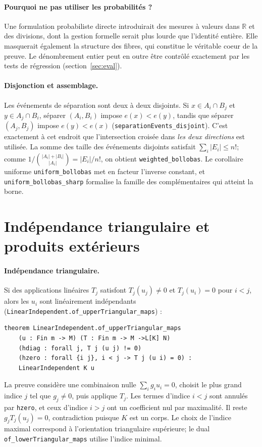 \documentclass[11pt]{article}
\newcommand{\bind}[2]{\binom{#1}{#2}}
\begin{document}
\paragraph{Pourquoi ne pas utiliser les probabilités ?} Une formulation probabiliste
directe introduirait des mesures à valeurs dans $\mathbb{R}$ et des divisions, dont la
gestion formelle serait plus lourde que l'identité entière. Elle masquerait également
la structure des fibres, qui constitue le véritable coeur de la preuve. Le dénombrement
entier peut en outre être contrôlé exactement par les tests de régression
(section~\ref{sec:eval}).

\paragraph{Disjonction et assemblage.} Les événements de séparation sont deux à deux
disjoints. Si $x\in A_i\cap B_j$ et $y\in A_j\cap B_i$, séparer $(A_i,B_i)$ impose
$e(x)<e(y)$, tandis que séparer $(A_j,B_j)$ impose $e(y)<e(x)$
(\lstinline{separationEvents_disjoint}). C'est exactement à cet endroit que
l'intersection croisée dans \emph{les deux directions} est utilisée. La somme des
taille des événements disjoints satisfait $\sum_i|E_i|\le n!$; comme
$1/\bind{|A_i|+|B_i|}{|A_i|}=|E_i|/n!$, on obtient
\lstinline{weighted_bollobas}. Le corollaire uniforme
\lstinline{uniform_bollobas} met en facteur l'inverse constant, et
\lstinline{uniform_bollobas_sharp} formalise la famille des complémentaires qui atteint
la borne.

\section{Indépendance triangulaire et produits extérieurs}\label{sec:ext}

\paragraph{Indépendance triangulaire.} Si des applications linéaires $T_j$ satisfont
$T_j(u_j)\neq0$ et $T_j(u_i)=0$ pour $i<j$, alors les $u_i$ sont linéairement
indépendants (\lstinline{LinearIndependent.of_upperTriangular_maps}) :
\begin{verbatim}
theorem LinearIndependent.of_upperTriangular_maps
    (u : Fin m -> M) (T : Fin m -> M ->L[K] N)
    (hdiag : forall j, T j (u j) != 0)
    (hzero : forall {i j}, i < j -> T j (u i) = 0) :
    LinearIndependent K u
\end{verbatim}
La preuve considère une combinaison nulle $\sum_i g_i u_i=0$, choisit le plus grand
indice $j$ tel que $g_j\neq0$, puis applique $T_j$. Les termes d'indice $i<j$ sont
annulés par \texttt{hzero}, et ceux d'indice $i>j$ ont un coefficient nul par maximalité.
Il reste $g_jT_j(u_j)=0$, contradiction puisque $K$ est un corps. Le choix de l'indice
maximal correspond à l'orientation triangulaire supérieure; le dual
\lstinline{of_lowerTriangular_maps} utilise l'indice minimal.
\end{document}

